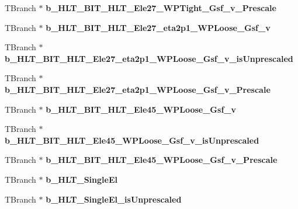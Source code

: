 \begin{DoxyCompactItemize}
\item 
\hypertarget{classMiniTree_afb0b56e87ef6b8e22325c4d97635cea6}{}\label{classMiniTree_afb0b56e87ef6b8e22325c4d97635cea6} 
T\+Branch $\ast$ {\bfseries b\+\_\+\+H\+L\+T\+\_\+\+B\+I\+T\+\_\+\+H\+L\+T\+\_\+\+Ele27\+\_\+\+W\+P\+Tight\+\_\+\+Gsf\+\_\+v\+\_\+\+Prescale}
\item 
\hypertarget{classMiniTree_ad57e32b50f5a6b5508a454409ec9b768}{}\label{classMiniTree_ad57e32b50f5a6b5508a454409ec9b768} 
T\+Branch $\ast$ {\bfseries b\+\_\+\+H\+L\+T\+\_\+\+B\+I\+T\+\_\+\+H\+L\+T\+\_\+\+Ele27\+\_\+eta2p1\+\_\+\+W\+P\+Loose\+\_\+\+Gsf\+\_\+v}
\item 
\hypertarget{classMiniTree_a9867e282d59068923ce5cf805d8a81a0}{}\label{classMiniTree_a9867e282d59068923ce5cf805d8a81a0} 
T\+Branch $\ast$ {\bfseries b\+\_\+\+H\+L\+T\+\_\+\+B\+I\+T\+\_\+\+H\+L\+T\+\_\+\+Ele27\+\_\+eta2p1\+\_\+\+W\+P\+Loose\+\_\+\+Gsf\+\_\+v\+\_\+is\+Unprescaled}
\item 
\hypertarget{classMiniTree_a2f1791b079fc45bd6e77ad09cb0a2491}{}\label{classMiniTree_a2f1791b079fc45bd6e77ad09cb0a2491} 
T\+Branch $\ast$ {\bfseries b\+\_\+\+H\+L\+T\+\_\+\+B\+I\+T\+\_\+\+H\+L\+T\+\_\+\+Ele27\+\_\+eta2p1\+\_\+\+W\+P\+Loose\+\_\+\+Gsf\+\_\+v\+\_\+\+Prescale}
\item 
\hypertarget{classMiniTree_a109b25cc4f0e1647c677865ff5364636}{}\label{classMiniTree_a109b25cc4f0e1647c677865ff5364636} 
T\+Branch $\ast$ {\bfseries b\+\_\+\+H\+L\+T\+\_\+\+B\+I\+T\+\_\+\+H\+L\+T\+\_\+\+Ele45\+\_\+\+W\+P\+Loose\+\_\+\+Gsf\+\_\+v}
\item 
\hypertarget{classMiniTree_a225da190fbf7832af6c91246c252c486}{}\label{classMiniTree_a225da190fbf7832af6c91246c252c486} 
T\+Branch $\ast$ {\bfseries b\+\_\+\+H\+L\+T\+\_\+\+B\+I\+T\+\_\+\+H\+L\+T\+\_\+\+Ele45\+\_\+\+W\+P\+Loose\+\_\+\+Gsf\+\_\+v\+\_\+is\+Unprescaled}
\item 
\hypertarget{classMiniTree_a92901dd4b772903604c492c48e7fa028}{}\label{classMiniTree_a92901dd4b772903604c492c48e7fa028} 
T\+Branch $\ast$ {\bfseries b\+\_\+\+H\+L\+T\+\_\+\+B\+I\+T\+\_\+\+H\+L\+T\+\_\+\+Ele45\+\_\+\+W\+P\+Loose\+\_\+\+Gsf\+\_\+v\+\_\+\+Prescale}
\item 
\hypertarget{classMiniTree_a40402a795d97ac773f8e521a9581b52d}{}\label{classMiniTree_a40402a795d97ac773f8e521a9581b52d} 
T\+Branch $\ast$ {\bfseries b\+\_\+\+H\+L\+T\+\_\+\+Single\+El}
\item 
\hypertarget{classMiniTree_a7f33b5b1c6e1ed501181e1fb3f6f5fe6}{}\label{classMiniTree_a7f33b5b1c6e1ed501181e1fb3f6f5fe6} 
T\+Branch $\ast$ {\bfseries b\+\_\+\+H\+L\+T\+\_\+\+Single\+El\+\_\+is\+Unprescaled}

\end{DoxyCompactItemize}

